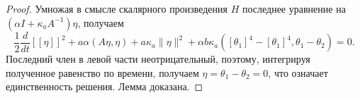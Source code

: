 \begin{proof}
    Умножая в смысле скалярного произведения $H$
    последнее уравнение на $\left(\alpha I+\kappa_{a} A^{-1}\right) \eta$,
    получаем
    \[
        \frac{1}{2} \frac{d}{d t}[[\eta]]^{2}
        +a \alpha(A \eta, \eta)
        +a \kappa_{a}\|\eta\|^{2}
        +\alpha b \kappa_{a}\left(\left[\theta_{1}\right]^{4}
        -\left[\theta_{1}\right]^{4}, \theta_{1}-\theta_{2}\right)=0.
    \]
    Последний член в левой части неотрицательный,
    поэтому, интегрируя полученное равенство по времени,
    получаем $\eta=\theta_{1}-\theta_{2}=0$, что означает единственность решения.
    Лемма доказана.

\end{proof}

%
%
%
%
%
%


